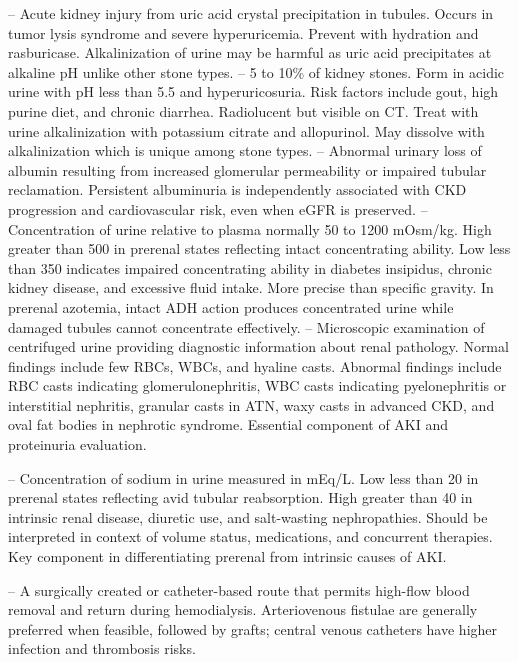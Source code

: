 -- Acute kidney injury from uric acid crystal precipitation in tubules. Occurs in tumor lysis syndrome and severe hyperuricemia. Prevent with hydration and rasburicase. Alkalinization of urine may be harmful as uric acid precipitates at alkaline pH unlike other stone types.
-- 5 to 10\% of kidney stones. Form in acidic urine with pH less than 5.5 and hyperuricosuria. Risk factors include gout, high purine diet, and chronic diarrhea. Radiolucent but visible on CT. Treat with urine alkalinization with potassium citrate and allopurinol. May dissolve with alkalinization which is unique among stone types.
-- Abnormal urinary loss of albumin resulting from increased glomerular permeability or impaired tubular reclamation. Persistent albuminuria is independently associated with CKD progression and cardiovascular risk, even when eGFR is preserved.
-- Concentration of urine relative to plasma normally 50 to 1200 mOsm/kg. High greater than 500 in prerenal states reflecting intact concentrating ability. Low less than 350 indicates impaired concentrating ability in diabetes insipidus, chronic kidney disease, and excessive fluid intake. More precise than specific gravity. In prerenal azotemia, intact ADH action produces concentrated urine while damaged tubules cannot concentrate effectively.
-- Microscopic examination of centrifuged urine providing diagnostic information about renal pathology. Normal findings include few RBCs, WBCs, and hyaline casts. Abnormal findings include RBC casts indicating glomerulonephritis, WBC casts indicating pyelonephritis or interstitial nephritis, granular casts in ATN, waxy casts in advanced CKD, and oval fat bodies in nephrotic syndrome. Essential component of AKI and proteinuria evaluation.

-- Concentration of sodium in urine measured in mEq/L. Low less than 20 in prerenal states reflecting avid tubular reabsorption. High greater than 40 in intrinsic renal disease, diuretic use, and salt-wasting nephropathies. Should be interpreted in context of volume status, medications, and concurrent therapies. Key component in differentiating prerenal from intrinsic causes of AKI.

-- A surgically created or catheter-based route that permits high-flow blood removal and return during hemodialysis. Arteriovenous fistulae are generally preferred when feasible, followed by grafts; central venous catheters have higher infection and thrombosis risks.

